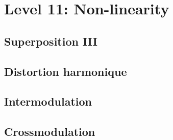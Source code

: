 
\section{Level 11: Non-linearity}
\subsection{Superposition III}
\subsection{Distortion harmonique}
\subsection{Intermodulation}
\subsection{Crossmodulation}
